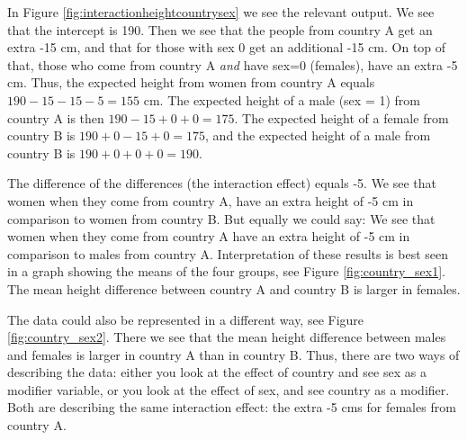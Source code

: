 In Figure \ref{fig:interactionheightcountrysex} we see the relevant output. We see that the intercept is 190. Then we see that the people from country A get an extra -15 cm, and that for those with sex 0 get an additional -15 cm. On top of that, those who come from country A \textit{and} have sex=0 (females), have an extra -5 cm. Thus, the expected height from women from country A equals $190-15-15-5=155$ cm. The expected height of a male (sex = 1) from country A is then $190 - 15 + 0  + 0 = 175$. The expected height of a female from country B is $190 + 0 -15 +0 =175$, and the expected height of a male from country B is $190 + 0 + 0 + 0 = 190$. 

The difference of the differences (the interaction effect) equals -5. We see that women when they come from country A, have an extra height of -5 cm in comparison to women from country B. But equally we could say: We see that women when they come from country A have an extra height of -5 cm in comparison to males from country A. Interpretation of these results is best seen in a graph showing the means of the four groups, see Figure \ref{fig:country_sex1}. The mean height difference between country A and country B is larger in females.

\begin{knitrout}
\color{fgcolor}\begin{kframe}


{\ttfamily\noindent\bfseries{}}

{\ttfamily\noindent\bfseries{}}

{\ttfamily\noindent\bfseries{}}\end{kframe}
\end{knitrout}


The data could also be represented in a different way, see Figure \ref{fig:country_sex2}. There we see that the mean height difference between males and females is larger in country A than in country B. Thus, there are two ways of describing the data: either you look at the effect of country and see sex as a modifier variable, or you look at the effect of sex, and see country as a modifier. Both are describing the same interaction effect: the extra -5 cms for females from country A.

